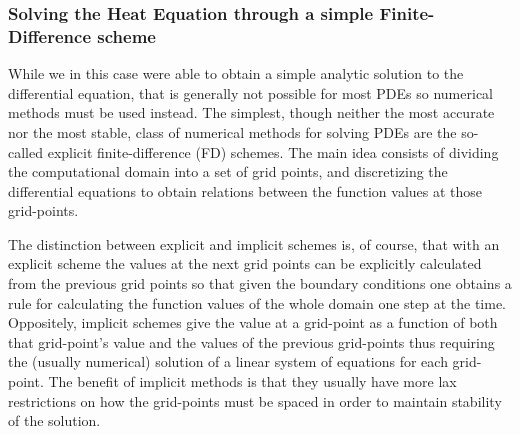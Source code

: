 \documentclass[reprint, english, nofootinbib]{revtex4-2}
\begin{document}
\subsubsection{Solving the Heat Equation through a simple Finite-Difference scheme\label{sec:finite difference theory}}
\noindent
While we in this case were able to obtain a simple analytic solution to the differential equation, that is generally not possible for most PDEs so numerical methods must be used instead. The simplest, though neither the most accurate nor the most stable, class of numerical methods for solving PDEs are the so-called explicit finite-difference (FD) schemes. The main idea consists of dividing the computational domain into a set of grid points, and discretizing the differential equations to obtain relations between the function values at those grid-points. 

The distinction between explicit and implicit schemes is, of course, that with an explicit scheme the values at the next grid points can be explicitly calculated from the previous grid points so that given the boundary conditions one obtains a rule for calculating the function values of the whole domain one step at the time. Oppositely, implicit schemes give the value at a grid-point as a function of both that grid-point's value and the values of the previous grid-points thus requiring the (usually numerical) solution of a linear system of equations for each grid-point. The benefit of implicit methods is that they usually have more lax restrictions on how the grid-points must be spaced in order to maintain stability of the solution.
\end{document}
